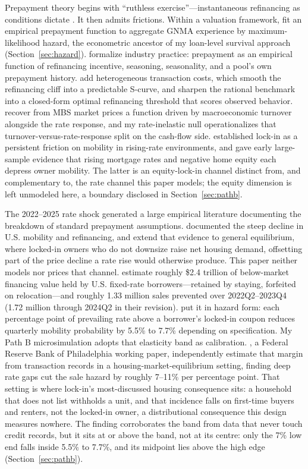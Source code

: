 \documentclass[12pt]{article}
\begin{document}
Prepayment theory begins with ``ruthless exercise''---instantaneous refinancing as conditions dictate \citep{dunn1981}. It then admits frictions. Within a valuation framework, \citet{schwartz1989} fit an empirical prepayment function to aggregate GNMA experience by maximum-likelihood hazard, the econometric ancestor of my loan-level survival approach (Section~\ref{sec:hazard}). \citet{richard1989} formalize industry practice: prepayment as an empirical function of refinancing incentive, seasoning, seasonality, and a pool's own prepayment history. \citet{stanton1995} add heterogeneous transaction costs, which smooth the refinancing cliff into a predictable S-curve, and \citet{agarwal2013} sharpen the rational benchmark into a closed-form optimal refinancing threshold that scores observed behavior. \citet{chernov2018} recover from MBS market prices a function driven by macroeconomic turnover alongside the rate response, and my rate-inelastic null operationalizes that turnover-versus-rate-response split on the cash-flow side. \citet{quigley1987,quigley2002} established lock-in as a persistent friction on mobility in rising-rate environments, and \citet{ferreira2010} gave early large-sample evidence that rising mortgage rates and negative home equity each depress owner mobility. The latter is an equity-lock-in channel distinct from, and complementary to, the rate channel this paper models; the equity dimension is left unmodeled here, a boundary disclosed in Section~\ref{sec:pathb}.

The 2022--2025 rate shock generated a large empirical literature documenting the breakdown of standard prepayment assumptions. \citet{fonseca2024} documented the steep decline in U.S. mobility and refinancing, and \citet{fonseca2026} extend that evidence to general equilibrium, where locked-in owners who do not downsize raise net housing demand, offsetting part of the price decline a rate rise would otherwise produce. This paper neither models nor prices that channel. \citet{batzer2024} estimate roughly \$2.4 trillion of below-market financing value held by U.S. fixed-rate borrowers---retained by staying, forfeited on relocation---and roughly 1.33 million sales prevented over 2022Q2--2023Q4 (1.72 million through 2024Q2 in their revision). \citet{liebersohn2024} put it in hazard form: each percentage point of prevailing rate above a borrower's locked-in coupon reduces quarterly mobility probability by 5.5\% to 7.7\% depending on specification. My Path B microsimulation adopts that elasticity band as calibration. \citet{graybill2026}, a Federal Reserve Bank of Philadelphia working paper, independently estimate that margin from transaction records in a housing-market-equilibrium setting, finding deep rate gaps cut the sale hazard by roughly 7--11\% per percentage point. That setting is where lock-in's most-discussed housing consequence sits: a household that does not list withholds a unit, and that incidence falls on first-time buyers and renters, not the locked-in owner, a distributional consequence this design measures nowhere. The finding corroborates the band from data that never touch credit records, but it sits at or above the band, not at its centre: only the 7\% low end falls inside 5.5\% to 7.7\%, and its midpoint lies above the high edge (Section~\ref{sec:pathb}).
\end{document}
